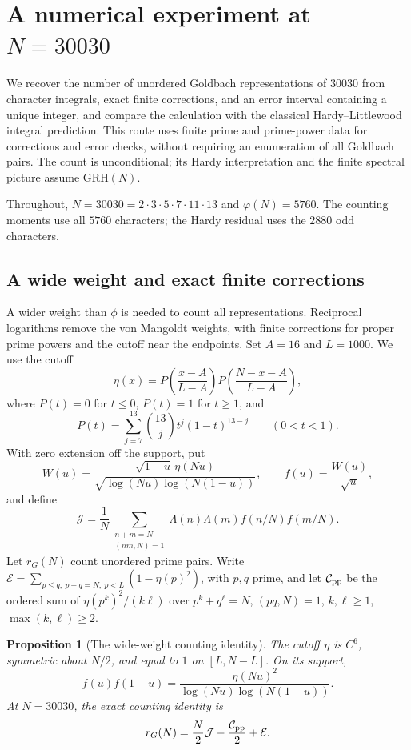\documentclass[12pt,a4paper]{amsart}
\numberwithin{equation}{section}
\def\le{\leqslant}
\def\ge{\geqslant}
\theoremstyle{plain}
\newtheorem{proposition}{Proposition}[section]
\theoremstyle{definition}
\theoremstyle{remark}
\begin{document}
\section{A numerical experiment at \texorpdfstring{$N=30030$}{N=30030}}
\label{proof:app:numerical}

We recover the number of unordered Goldbach representations of $30030$
from character integrals, exact finite corrections, and an error interval
containing a unique integer, and compare the calculation with the classical
Hardy--Littlewood integral prediction. This route uses finite prime and
prime-power data for corrections and error checks, without requiring an
enumeration of all Goldbach pairs. The count is unconditional; its Hardy
interpretation and the finite spectral picture assume $\mathrm{GRH}(N)$.

Throughout, $N=30030=2\cdot3\cdot5\cdot7\cdot11\cdot13$ and
$\varphi(N)=5760$. The counting moments use all $5760$ characters;
the Hardy residual uses the $2880$ odd characters.

\subsection{A wide weight and exact finite corrections}
\label{proof:app:num:weight}

A wider weight than $\phi$ is needed to count all representations.
Reciprocal logarithms remove the von Mangoldt weights, with finite
corrections for proper prime powers and the cutoff near the endpoints.
Set $A=16$ and $L=1000$. We use the cutoff
\[
 \eta(x)=P\!\left(\frac{x-A}{L-A}\right)
          P\!\left(\frac{N-x-A}{L-A}\right),
\]
where $P(t)=0$ for $t\le0$, $P(t)=1$ for $t\ge1$, and
\[
 P(t)=\sum_{j=7}^{13}\binom{13}{j}t^j(1-t)^{13-j}
 \qquad(0<t<1).
\]
With zero extension off the support, put
\[
 W(u)=\frac{\sqrt{1-u}\,\eta(Nu)}
                {\sqrt{\log(Nu)\log(N(1-u))}},\qquad f(u)=\frac{W(u)}{\sqrt u},
\]
and define
\[
 \mathcal J=\frac1N\sum_{\substack{n+m=N\\(nm,N)=1}}
        \Lambda(n)\Lambda(m)f(n/N)f(m/N).
\]
Let $r_G(N)$ count unordered prime pairs. Write
$\mathcal E=\sum_{p\le q,\ p+q=N,\ p<L}(1-\eta(p)^2)$, with $p,q$ prime,
and let $\mathcal C_{\rm pp}$ be the ordered sum of
$\eta(p^k)^2/(k\ell)$ over $p^k+q^\ell=N$, $(pq,N)=1$, $k,\ell\ge1$,
$\max(k,\ell)\ge2$.

\begin{proposition}[The wide-weight counting identity]
\label{proof:v9:wide-weight-count}
The cutoff $\eta$ is $C^6$, symmetric about $N/2$, and equal to $1$
on $[L,N-L]$. On its support,
\[
 f(u)f(1-u)=\frac{\eta(Nu)^2}{\log(Nu)\log(N(1-u))}.
\]
At $N=30030$, the exact counting identity is
\begin{equation}\label{proof:app:num:count}
 r_G(N)=\frac N2\mathcal J-\frac{\mathcal C_{\rm pp}}2+\mathcal E.
\end{equation}
\end{proposition}
\end{document}
